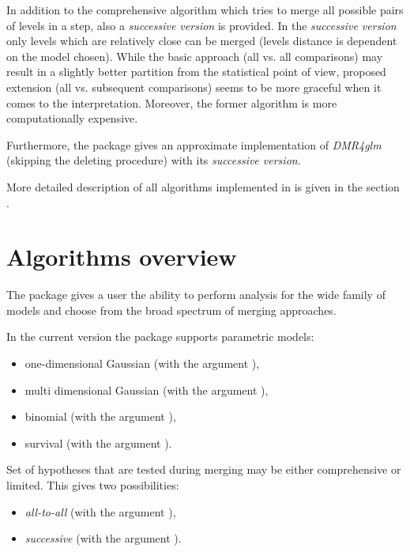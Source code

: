 In addition to the comprehensive algorithm which tries to merge all possible pairs of levels in a step, also a \emph{successive version} is provided. In the \emph{successive version} only levels which are relatively close can be merged (levels distance is dependent on the model chosen). While the basic approach (all vs. all comparisons) may result in a slightly better partition from the statistical point of view, proposed extension (all vs. subsequent comparisons) seems to be more graceful when it comes to the interpretation. Moreover, the former algorithm is more computationally expensive.

Furthermore, the \factorMerger package gives an approximate implementation of \emph{DMR4glm} (skipping the deleting procedure) with its \emph{successive version}.

More detailed description of all algorithms implemented in \factorMerger is given in the section .

\section{Algorithms overview}\label{algs}

The \factorMerger package gives a user the ability to perform analysis for the wide family of models and choose from the broad spectrum of merging approaches. 

In the current version the package supports parametric models: 

\begin{itemize}
\item one-dimensional Gaussian (with the argument ),
\item multi dimensional Gaussian (with the argument ),
\item binomial (with the argument ),
\item survival (with the argument ).
\end{itemize}
Set of hypotheses that are tested during merging may be either comprehensive or limited. This gives two possibilities:

\begin{itemize}
\item \emph{all-to-all} (with the argument ),
\item \emph{successive} (with the argument ).

\end{itemize}


